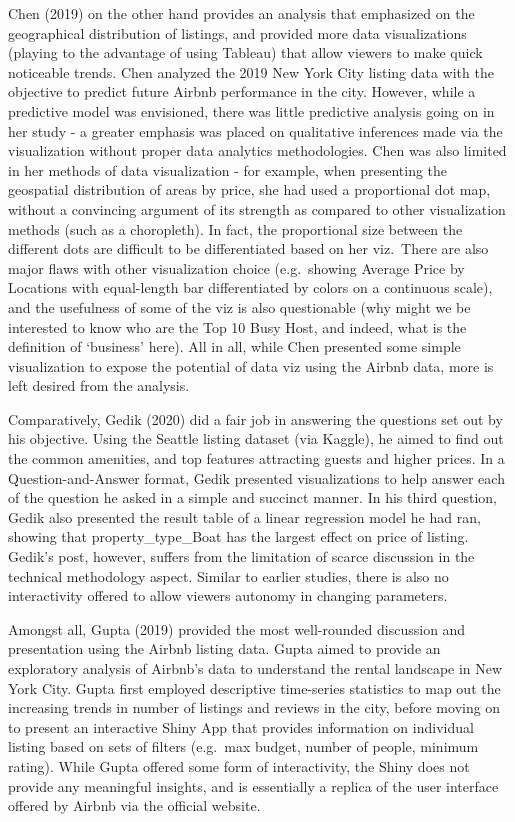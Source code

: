 \documentclass{acm_proc_article-sp}
\begin{document}
Chen (2019) on the other hand provides an analysis that emphasized on
the geographical distribution of listings, and provided more data
visualizations (playing to the advantage of using Tableau) that allow
viewers to make quick noticeable trends. Chen analyzed the 2019 New York
City listing data with the objective to predict future Airbnb
performance in the city. However, while a predictive model was
envisioned, there was little predictive analysis going on in her study -
a greater emphasis was placed on qualitative inferences made via the
visualization without proper data analytics methodologies. Chen was also
limited in her methods of data visualization - for example, when
presenting the geospatial distribution of areas by price, she had used a
proportional dot map, without a convincing argument of its strength as
compared to other visualization methods (such as a choropleth). In fact,
the proportional size between the different dots are difficult to be
differentiated based on her viz.~There are also major flaws with other
visualization choice (e.g.~showing Average Price by Locations with
equal-length bar differentiated by colors on a continuous scale), and
the usefulness of some of the viz is also questionable (why might we be
interested to know who are the Top 10 Busy Host, and indeed, what is the
definition of `business' here). All in all, while Chen presented some
simple visualization to expose the potential of data viz using the
Airbnb data, more is left desired from the analysis.

Comparatively, Gedik (2020) did a fair job in answering the questions
set out by his objective. Using the Seattle listing dataset (via
Kaggle), he aimed to find out the common amenities, and top features
attracting guests and higher prices. In a Question-and-Answer format,
Gedik presented visualizations to help answer each of the question he
asked in a simple and succinct manner. In his third question, Gedik also
presented the result table of a linear regression model he had ran,
showing that property\_type\_Boat has the largest effect on price of
listing. Gedik's post, however, suffers from the limitation of scarce
discussion in the technical methodology aspect. Similar to earlier
studies, there is also no interactivity offered to allow viewers
autonomy in changing parameters.

Amongst all, Gupta (2019) provided the most well-rounded discussion and
presentation using the Airbnb listing data. Gupta aimed to provide an
exploratory analysis of Airbnb's data to understand the rental landscape
in New York City. Gupta first employed descriptive time-series
statistics to map out the increasing trends in number of listings and
reviews in the city, before moving on to present an interactive Shiny
App that provides information on individual listing based on sets of
filters (e.g.~max budget, number of people, minimum rating). While Gupta
offered some form of interactivity, the Shiny does not provide any
meaningful insights, and is essentially a replica of the user interface
offered by Airbnb via the official website.
\end{document}
